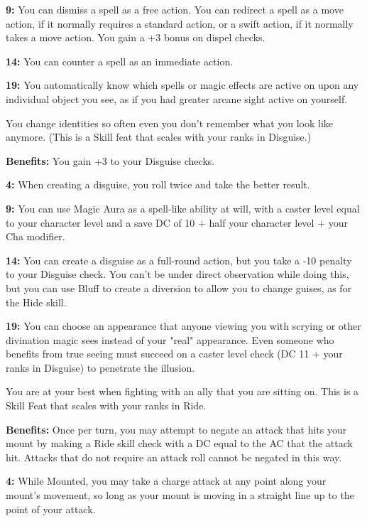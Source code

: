 \textbf{9:} You can dismiss a spell as a free action. You can redirect a spell as a move action, if it normally requires a standard action, or a swift action, if it normally takes a move action. You gain a +3 bonus on dispel checks.

\textbf{14:} You can counter a spell as an immediate action.

\textbf{19:} You automatically know which spells or magic effects are active on upon any individual object you see, as if you had greater arcane sight active on yourself.


You change identities so often even you don't remember what you look like anymore. (This is a Skill feat that scales with your ranks in Disguise.)

\textbf{Benefits:} You gain +3 to your Disguise checks.

\textbf{4:} When creating a disguise, you roll twice and take the better result.

\textbf{9:} You can use Magic Aura as a spell-like ability at will, with a caster level equal to your character level and a save DC of 10 + half your character level + your Cha modifier.

\textbf{14:} You can create a disguise as a full-round action, but you take a -10 penalty to your Disguise check. You can't be under direct observation while doing this, but you can use Bluff to create a diversion to allow you to change guises, as for the Hide skill.

\textbf{19:} You can choose an appearance that anyone viewing you with scrying or other divination magic sees instead of your "real" appearance. Even someone who benefits from true seeing must succeed on a caster level check (DC 11 + your ranks in Disguise) to penetrate the illusion.



You are at your best when fighting with an ally that you are sitting on. This is a Skill Feat that scales with your ranks in Ride.

\textbf{Benefits:} Once per turn, you may attempt to negate an attack that hits your mount by making a Ride skill check with a DC equal to the AC that the attack hit. Attacks that do not require an attack roll cannot be negated in this way.

\textbf{4:} While Mounted, you may take a charge attack at any point along your mount's movement, so long as your mount is moving in a straight line up to the point of your attack.


